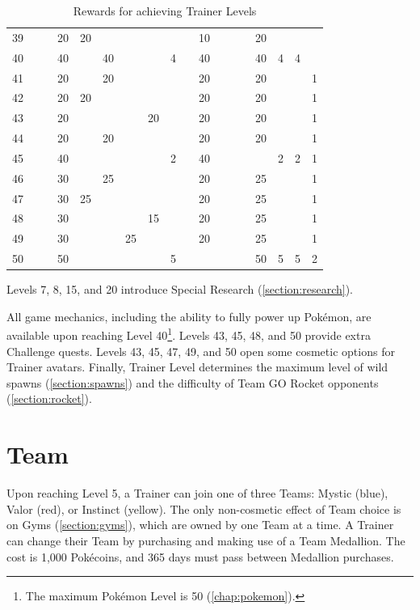 \begin{table}[t]
\begin{center}
\begin{tabular}{r|g c g c g c g c g c g c g c g c g}
   39 &    &    & 20 & 20 &    &    &    &   &    & 10 &    &    &    & 20 &   &   & \\
   40 &    &    & 40 &    & 40 &    &    & 4 &    & 40 &    &    &    & 40 & 4 & 4 & \\
   41 &    &    & 20 &    & 20 &    &    &   &    & 20 &    &    &    & 20 &   &   & 1 \\
   42 &    &    & 20 & 20 &    &    &    &   &    & 20 &    &    &    & 20 &   &   & 1 \\
   43 &    &    & 20 &    &    &    & 20 &   &    & 20 &    &    &    & 20 &   &   & 1 \\
   44 &    &    & 20 &    & 20 &    &    &   &    & 20 &    &    &    & 20 &   &   & 1 \\
   45 &    &    & 40 &    &    &    &    & 2 &    & 40 &    &    &    &    & 2 & 2 & 1 \\
   46 &    &    & 30 &    & 25 &    &    &   &    & 20 &    &    &    & 25 &   &   & 1 \\
   47 &    &    & 30 & 25 &    &    &    &   &    & 20 &    &    &    & 25 &   &   & 1 \\
   48 &    &    & 30 &    &    &    & 15 &   &    & 20 &    &    &    & 25 &   &   & 1 \\
   49 &    &    & 30 &    &    & 25 &    &   &    & 20 &    &    &    & 25 &   &   & 1 \\
   50 &    &    & 50 &    &    &    &    & 5 &    &    &    &    &    & 50 & 5 & 5 & 2 \\
\end{tabular}
\caption{Rewards for achieving Trainer Levels}
\label{table:levelitems}
\end{center}
\end{table}
Levels 7, 8, 15, and 20 introduce Special Research (\autoref{section:research}).

All game mechanics, including the ability to fully power up Pokémon,
 are available upon reaching Level 40\footnote{The maximum Pokémon Level is 50 (\autoref{chap:pokemon}).}.
Levels 43, 45, 48, and 50 provide extra Challenge quests.
Levels 43, 45, 47, 49, and 50 open some cosmetic options for Trainer avatars.
Finally, Trainer Level determines the maximum level of wild spawns
  (\autoref{section:spawns}) and the difficulty of Team GO Rocket
  opponents (\autoref{section:rocket}).

\section{Team}
Upon reaching Level 5, a Trainer can join one of three Teams: Mystic (blue),
  Valor (red), or Instinct (yellow).
The only non-cosmetic effect of Team choice is on Gyms (\autoref{section:gyms}), which
  are owned by one Team at a time.
A Trainer can change their Team by purchasing and making use of a Team Medallion.
The cost is 1,000 Pokécoins, and 365 days must pass between Medallion purchases.

